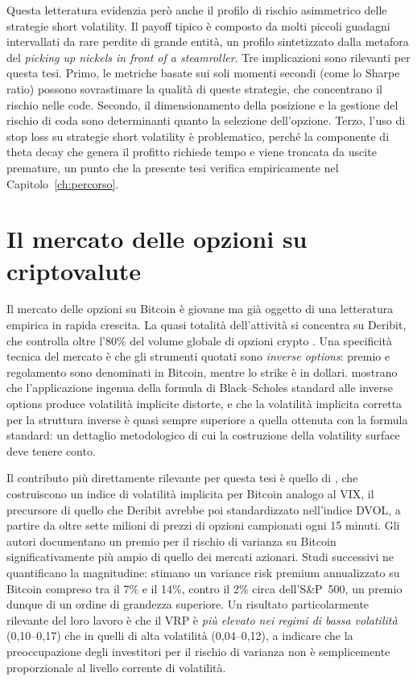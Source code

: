 Questa letteratura evidenzia però anche il profilo di rischio asimmetrico
delle strategie short volatility. Il payoff tipico è composto da molti
piccoli guadagni intervallati da rare perdite di grande entità, un profilo
sintetizzato dalla metafora del \emph{picking up nickels in front of a
steamroller}. Tre implicazioni sono rilevanti per questa tesi. Primo, le
metriche basate sui soli momenti secondi (come lo Sharpe ratio) possono
sovrastimare la qualità di queste strategie, che concentrano il rischio
nelle code. Secondo, il dimensionamento della posizione e la gestione del
rischio di coda sono determinanti quanto la selezione dell'opzione. Terzo,
l'uso di stop loss su strategie short volatility è problematico, perché la
componente di theta decay che genera il profitto richiede tempo e viene
troncata da uscite premature, un punto che la presente tesi verifica
empiricamente nel Capitolo~\ref{ch:percorso}.

\section{Il mercato delle opzioni su criptovalute}
\label{sec:lit-crypto-options}

Il mercato delle opzioni su Bitcoin è giovane ma già oggetto di una
letteratura empirica in rapida crescita. La quasi totalità dell'attività si
concentra su Deribit, che controlla oltre l'80\% del volume globale di
opzioni crypto \citep{alexander2023inverse}. Una specificità tecnica del
mercato è che gli strumenti quotati sono \emph{inverse options}: premio e
regolamento sono denominati in Bitcoin, mentre lo strike è in dollari.
\citet{alexander2023inverse} mostrano che l'applicazione ingenua della
formula di Black--Scholes standard alle inverse options produce volatilità
implicite distorte, e che la volatilità implicita corretta per la struttura
inverse è quasi sempre superiore a quella ottenuta con la formula standard:
un dettaglio metodologico di cui la costruzione della volatility
surface deve tenere conto.

Il contributo più direttamente rilevante per questa tesi è quello di
\citet{alexander2020bitcoin}, che costruiscono un indice di volatilità
implicita per Bitcoin analogo al VIX, il precursore di quello che
Deribit avrebbe poi standardizzato nell'indice DVOL, a partire da oltre
sette milioni di prezzi di opzioni campionati ogni 15 minuti. Gli autori
documentano un premio per il rischio di varianza su Bitcoin
significativamente più ampio di quello dei mercati azionari. Studi
successivi ne quantificano la magnitudine: \citet{almeida2024risk} stimano
un variance risk premium annualizzato su Bitcoin compreso tra il 7\% e il
14\%, contro il 2\% circa dell'S\&P~500, un premio dunque di un ordine
di grandezza superiore. Un risultato particolarmente rilevante del loro
lavoro è che il VRP è \emph{più elevato nei regimi di bassa volatilità}
(0,10--0,17) che in quelli di alta volatilità (0,04--0,12), a indicare che
la preoccupazione degli investitori per il rischio di varianza non è
semplicemente proporzionale al livello corrente di volatilità.

